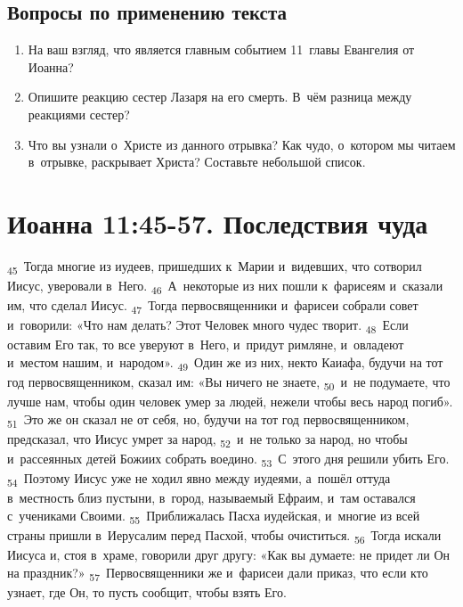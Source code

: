 \documentclass[a4paper,12pt]{article}
\begin{document}
\subsection*{Вопросы по применению текста} 
\begin{enumerate}
    \item На ваш взгляд, что является главным событием 11~главы Евангелия от Иоанна? 
    
    \myline
    
    \myline
    \item Опишите реакцию сестер Лазаря на его смерть. В~чём разница между реакциями сестер? 
    
    \myline
    
    \myline
    \item Что вы узнали о~Христе из данного отрывка? Как чудо, о~котором мы читаем в~отрывке, раскрывает Христа? Составьте небольшой список.
    
    \myline
    
    \myline
\end{enumerate}



\section{Иоанна 11:45-57. Последствия чуда}

\textsubscript{45}~Тогда многие из иудеев, пришедших к~Марии и~видевших, что сотворил Иисус, уверовали в~Него.
\textsubscript{46}~А~некоторые из них пошли к~фарисеям и~сказали им, что сделал Иисус.
\textsubscript{47}~Тогда первосвященники и~фарисеи собрали совет и~говорили: «Что нам делать? Этот Человек много чудес творит.
\textsubscript{48}~Если оставим Его так, то все уверуют в~Него, и~придут римляне, и~овладеют и~местом нашим, и~народом».
\textsubscript{49}~Один же из них, некто Каиафа, будучи на тот год первосвященником, сказал им: «Вы ничего не знаете,
\textsubscript{50}~и~не подумаете, что лучше нам, чтобы один человек умер за людей, нежели чтобы весь народ погиб».
\textsubscript{51}~Это же он сказал не от себя, но, будучи на тот год первосвященником, предсказал, что Иисус умрет за народ,
\textsubscript{52}~и~не только за народ, но чтобы и~рассеянных детей Божиих собрать воедино.
\textsubscript{53}~С~этого дня решили убить Его.
\textsubscript{54}~Поэтому Иисус уже не ходил явно между иудеями, а~пошёл оттуда в~местность близ пустыни, в~город, называемый Ефраим, и~там оставался с~учениками Своими.
\textsubscript{55}~Приближалась Пасха иудейская, и~многие из всей страны пришли в~Иерусалим перед Пасхой, чтобы очиститься.
\textsubscript{56}~Тогда искали Иисуса и, стоя в~храме, говорили друг другу: «Как вы думаете: не придет ли Он на праздник?»
\textsubscript{57}~Первосвященники же и~фарисеи дали приказ, что если кто узнает, где Он, то пусть сообщит, чтобы взять Его. 
\end{document}
